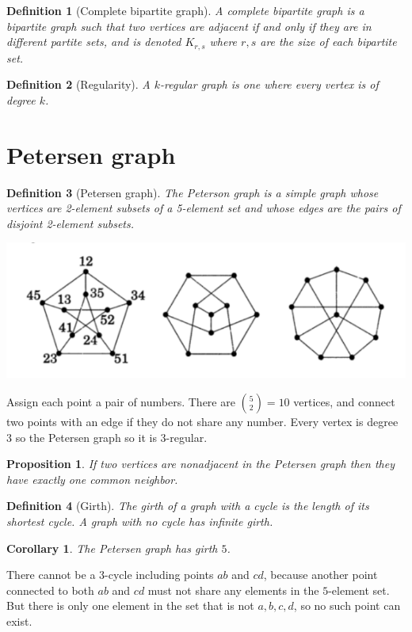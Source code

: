 \documentclass{article}
\newtheorem{defn}{Definition}[section]
\newtheorem{cordefn}{Corollary}[defn]
\newtheorem{prop}{Proposition}[section]
\begin{document}
\begin{defn}[Complete bipartite graph]
	A complete bipartite graph is a bipartite graph such that two vertices are adjacent if and only if they are in different partite sets, and is denoted $K_{r,s}$ where $r,s$ are the size of each bipartite set.
\end{defn}

\begin{defn}[Regularity]
	A $k$-regular graph is one where every vertex is of degree $k$.
\end{defn}

\section{Petersen graph}

\begin{defn}[Petersen graph]
	The Peterson graph is a simple graph whose vertices are 2-element subsets of a 5-element set and whose edges are the pairs of disjoint 2-element subsets.
\end{defn}
\begin{center}
	\includegraphics[width=0.6\linewidth]{petersen.png}
\end{center}
Assign each point a pair of numbers. There are $\binom 52=10$ vertices, and connect two points with an edge if they do not share any number. Every vertex is degree $3$ so the Petersen graph so it is $3$-regular.

\begin{prop}
	If two vertices are nonadjacent in the Petersen graph then they have exactly one common neighbor.
\end{prop}

\begin{defn}[Girth]
	The girth of a graph with a cycle is the length of its shortest cycle. A graph with no cycle has infinite girth.
\end{defn}
\begin{cordefn}
	The Petersen graph has girth $5$.
\end{cordefn}
There cannot be a $3$-cycle including points $ab$ and $cd$, because another point connected to both $ab$ and $cd$ must not share any elements in the $5$-element set. But there is only one element in the set that is not $a,b,c,d$, so no such point can exist.
\end{document}
